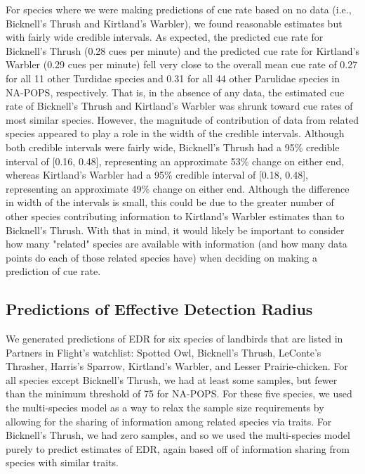 \documentclass[12pt]{article}
\begin{document}
\par For species where we were making predictions of cue rate based on no data (i.e., Bicknell's Thrush and Kirtland's Warbler), we found reasonable estimates but with fairly wide credible intervals.
As expected, the predicted cue rate for Bicknell's Thrush (0.28 cues per minute) and the predicted cue rate for Kirtland's Warbler (0.29 cues per minute) fell very close to the overall mean cue rate of 0.27 for all 11 other Turdidae species and 0.31 for all 44 other Parulidae species in NA-POPS, respectively.
That is, in the absence of any data, the estimated cue rate of Bicknell's Thrush and Kirtland's Warbler was shrunk toward cue rates of most similar species.
However, the magnitude of contribution of data from related species appeared to play a role in the width of the credible intervals.
Although both credible intervals were fairly wide, Bicknell's Thrush had a 95\% credible interval of [0.16, 0.48], representing an approximate 53\% change on either end, whereas Kirtland's Warbler had a 95\% credible interval of [0.18, 0.48], representing an approximate 49\% change on either end.
Although the difference in width of the intervals is small, this could be due to the greater number of other species contributing information to Kirtland's Warbler estimates than to Bicknell's Thrush.
With that in mind, it would likely be important to consider how many "related" species are available with information (and how many data points do each of those related species have) when deciding on making a prediction of cue rate.

\subsection{Predictions of Effective Detection Radius}

\par We generated predictions of EDR for six species of landbirds that are listed in Partners in Flight's watchlist: Spotted Owl, Bicknell's Thrush, LeConte's Thrasher, Harris's Sparrow, Kirtland's Warbler, and Lesser Prairie-chicken. 
For all species except Bicknell's Thrush, we had at least some samples, but fewer than the minimum threshold of 75 for NA-POPS.
For these five species, we used the multi-species model as a way to relax the sample size requirements by allowing for the sharing of information among related species via traits.
For Bicknell's Thrush, we had zero samples, and so we used the multi-species model purely to predict estimates of EDR, again based off of information sharing from species with similar traits.
\end{document}
